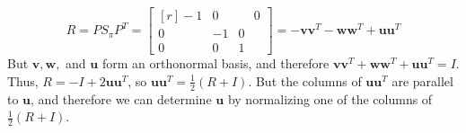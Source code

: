     \begin{equation*}
        R = PS_{\pi}P^T = \begin{bmatrix*}[r]-1 & 0 & \phantom{-}0 \\ 0 & -1 & 0 \\ 0 & 0 & 1 \end{bmatrix*} = -\mathbf{v}\mathbf{v}^T-\mathbf{w}\mathbf{w}^T +\mathbf{u}\mathbf{u}^T    
    \end{equation*}
    But $\mathbf{v},\mathbf{w},$ and $\mathbf{u}$ form an orthonormal basis,
    and therefore $\mathbf{v}\mathbf{v}^T + \mathbf{w}\mathbf{w}^T+\mathbf{u}\mathbf{u}^T = I$. Thus, $R = -I+2\mathbf{u}\mathbf{u}^T$, so $\mathbf{u} \mathbf{u}^T = \frac{1}{2}(R+I)$. But the columns of $\mathbf{u}\mathbf{u}^T$ are parallel to $\mathbf{u}$, and therefore we can determine $\mathbf{u}$ by normalizing one of the columns of $\frac{1}{2}(R+I)$.
